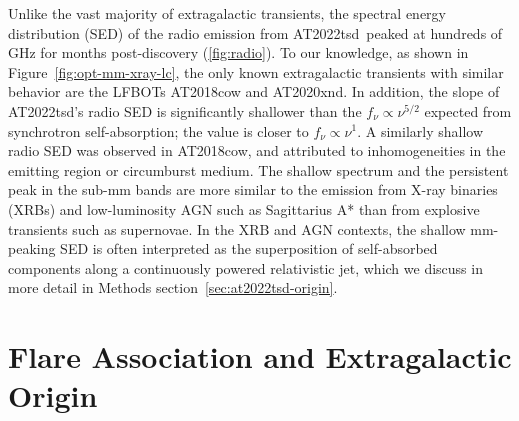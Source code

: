 \documentclass{nature_plusfigure}
\newcommand{\at}{AT2022tsd}
\begin{document}
\begin{methods}
Unlike the vast majority of extragalactic transients, the spectral energy distribution (SED) of the radio emission from \at\ peaked at hundreds of GHz for months post-discovery (\ref{fig:radio}). To our knowledge, as shown in Figure~\ref{fig:opt-mm-xray-lc}, the only known extragalactic transients with similar behavior are the LFBOTs AT2018cow\cite{Ho2019} and AT2020xnd\cite{Ho2022_AT2020xnd,Bright2022}.
In addition, the slope of \at's radio SED is significantly shallower than the $f_\nu \propto \nu^{5/2}$ expected from synchrotron self-absorption\cite{Rybicki1986}; the value is closer to $f_\nu \propto \nu^{1}$. A similarly shallow radio SED was observed in AT2018cow\cite{Nayana2021}, and attributed to inhomogeneities in the emitting region or circumburst medium\cite{Nayana2021}.
The shallow spectrum and the persistent peak in the sub-mm bands are more similar to the emission from X-ray binaries (XRBs\cite{Fender2001,Tetarenko2021,Fender2023}) and low-luminosity AGN such as Sagittarius A*\cite{Falcke1998} than from explosive transients such as supernovae\cite{Chevalier1998}. 
In the XRB and AGN contexts, the shallow mm-peaking SED is often interpreted as the superposition of self-absorbed components along a continuously powered relativistic jet\cite{Blandford1979}, which we discuss in more detail in Methods section~\ref{sec:at2022tsd-origin}.

\section{Flare Association and Extragalactic Origin}
\label{sec:flare-association}


\end{methods}
\end{document}
